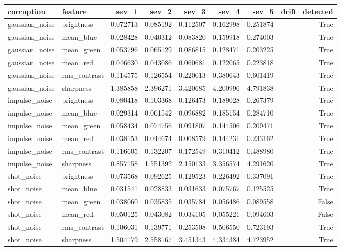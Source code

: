 \begin{tabular}{llrrrrrr}
\toprule
corruption & feature & sev_1 & sev_2 & sev_3 & sev_4 & sev_5 & drift_detected \\
\midrule
gaussian_noise & brightness & 0.072713 & 0.085192 & 0.112507 & 0.162998 & 0.251874 & True \\
gaussian_noise & mean_blue & 0.028428 & 0.040312 & 0.083820 & 0.159918 & 0.274003 & True \\
gaussian_noise & mean_green & 0.053796 & 0.065129 & 0.086815 & 0.128471 & 0.203225 & True \\
gaussian_noise & mean_red & 0.046630 & 0.043086 & 0.060681 & 0.122065 & 0.223818 & True \\
gaussian_noise & rms_contrast & 0.114575 & 0.126554 & 0.220013 & 0.380643 & 0.601419 & True \\
gaussian_noise & sharpness & 1.385858 & 2.396271 & 3.420685 & 4.200996 & 4.791838 & True \\
impulse_noise & brightness & 0.080418 & 0.103368 & 0.126473 & 0.189028 & 0.267379 & True \\
impulse_noise & mean_blue & 0.029314 & 0.061542 & 0.096882 & 0.185154 & 0.284710 & True \\
impulse_noise & mean_green & 0.058434 & 0.074756 & 0.091807 & 0.144506 & 0.209471 & True \\
impulse_noise & mean_red & 0.038153 & 0.044674 & 0.068579 & 0.144231 & 0.233162 & True \\
impulse_noise & rms_contrast & 0.116605 & 0.132207 & 0.172549 & 0.310412 & 0.488980 & True \\
impulse_noise & sharpness & 0.857158 & 1.551392 & 2.150133 & 3.356574 & 4.291620 & True \\
shot_noise & brightness & 0.073568 & 0.092625 & 0.129523 & 0.226492 & 0.337091 & True \\
shot_noise & mean_blue & 0.031541 & 0.028833 & 0.031633 & 0.075767 & 0.125525 & True \\
shot_noise & mean_green & 0.038060 & 0.035835 & 0.035784 & 0.056486 & 0.089558 & False \\
shot_noise & mean_red & 0.050125 & 0.043082 & 0.034105 & 0.055221 & 0.094603 & False \\
shot_noise & rms_contrast & 0.106031 & 0.139771 & 0.253508 & 0.506550 & 0.723193 & True \\
shot_noise & sharpness & 1.504179 & 2.558167 & 3.451343 & 4.334384 & 4.723952 & True \\
\bottomrule
\end{tabular}

